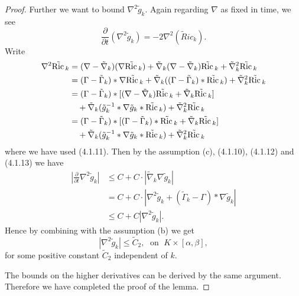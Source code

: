 \begin{proof}
Further we want to bound $\nabla^2\tilde{g}_k$. Again regarding
$\nabla$ as fixed in time, we see
$$
\frac{\partial}{\partial
t}(\nabla^2\tilde{g}_k)=-2\nabla^2(\tilde{R}ic_k).
$$
Write
\begin{align*}
\nabla^2\tilde{{\rm Ric}\,}_k& =
(\nabla-\tilde{\nabla}_k)(\nabla\tilde{{\rm Ric}\,}_k)+
\tilde{\nabla}_k(\nabla-\tilde{\nabla}_k)\tilde{{\rm Ric}\,}_k
+\tilde{\nabla}^2_k\tilde{{\rm Ric}\,}_k\\
&  = (\Gamma-\tilde{\Gamma}_k)*\nabla\tilde{{\rm Ric}\,}_k+
\tilde{\nabla}_k((\Gamma-\tilde{\Gamma}_k)*\tilde{{\rm Ric}\,}_k)
+\tilde{\nabla}^2_k\tilde{{\rm Ric}\,}_k\\
&
=(\Gamma-\tilde{\Gamma}_k)*[(\nabla-\tilde{\nabla}_k)\tilde{{\rm Ric}\,}_k
+\tilde{\nabla}_k\tilde{{\rm Ric}\,}_k] \\
&\quad+
\tilde{\nabla}_k(\tilde{g}_k^{-1}*\nabla\tilde{g}_k*\tilde{{\rm Ric}\,}_k)
+\tilde{\nabla}^2_k\tilde{{\rm Ric}\,}_k\\
&
=(\Gamma-\tilde{\Gamma}_k)*[(\Gamma-\tilde{\Gamma}_k)*\tilde{{\rm Ric}\,}_k
+\tilde{\nabla}_k\tilde{{\rm Ric}\,}_k] \\
&\quad+
\tilde{\nabla}_k(\tilde{g}_k^{-1}*\nabla\tilde{g}_k*\tilde{{\rm Ric}\,}_k)
+\tilde{\nabla}^2_k\tilde{{\rm Ric}\,}_k
\end{align*}
where we have used (4.1.11). Then by the assumption (c), (4.1.10),
(4.1.12) and (4.1.13) we have
\begin{align*}
|\frac{\partial}{\partial t}\nabla^2\tilde{g}_k|
&  \leq  C+C\cdot|\tilde{\nabla}_k\nabla\tilde{g}_k|\\
&  = C+C\cdot|\nabla^2\tilde{g}_k
+(\tilde{\Gamma}_k-\Gamma)*\nabla\tilde{g}_k|\\
&  \leq C+C|\nabla^2\tilde{g}_k|.
\end{align*}
Hence by combining with the assumption (b) we get
$$
|\nabla^2\tilde{g}_k|\leq\tilde{C}_2,\; \mbox{ on }\;
K\times[\alpha,\beta],
$$
for some positive constant $\tilde{C}_2$ independent of $k$.

The bounds on the higher derivatives can be derived by the same
argument. Therefore we have completed the proof of the lemma.
\end{proof}


